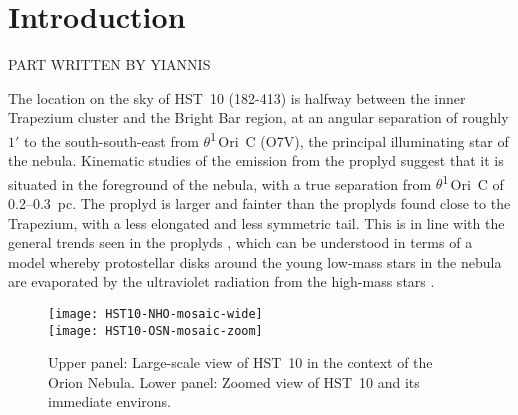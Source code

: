 \documentclass[useAMS,usenatbib]{mn2e}
\newcommand\texttheta{\ensuremath{\theta}}
\newcommand\thC{\texttheta\textsuperscript{1}\,Ori~C}
\begin{document}
\section{Introduction}

PART WRITTEN BY YIANNIS

The location on the sky of HST~10 (182-413) is halfway between the inner Trapezium cluster and the Bright Bar region, at an angular separation of roughly \(1'\) to the south-south-east from \thC{} (O7V), the principal illuminating star of the nebula.  Kinematic studies of the emission from the proplyd \cite{1999AJ....118.2350H} suggest that it is situated in the foreground of the nebula, with a true separation from \thC{} of 0.2--0.3~pc.  The proplyd is larger and fainter than the proplyds found close to the Trapezium, with a less elongated and less symmetric tail.  This is in line with the general trends seen in the proplyds \cite{1998AJ....116..293B, 1998AJ....115..263O}, which can be understood in terms of a model whereby protostellar disks around the young low-mass stars in the nebula are evaporated by the ultraviolet radiation from the high-mass stars \cite{Johnstone:1998, Henney:1998}.  

\begin{figure}
  \centering
  \texttt{[image: HST10-NHO-mosaic-wide]} \\
  \texttt{[image: HST10-OSN-mosaic-zoom]} 
  \caption{Upper panel: Large-scale view of HST~10 in the context of the Orion Nebula.  Lower panel: Zoomed view of HST~10 and its immediate environs.  }
  \label{fig:wfpc2-images}
\end{figure}


\end{document}

